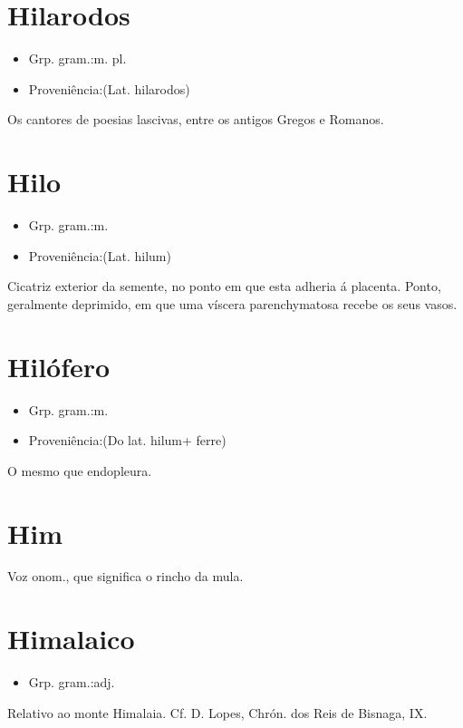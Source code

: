 \documentclass{article}
\begin{document}
\section{Hilarodos}
\begin{itemize}
\item {Grp. gram.:m. pl.}
\end{itemize}
\begin{itemize}
\item {Proveniência:(Lat. \textunderscore hilarodos\textunderscore )}
\end{itemize}
Os cantores de poesias lascivas, entre os antigos Gregos e Romanos.
\section{Hilo}
\begin{itemize}
\item {Grp. gram.:m.}
\end{itemize}
\begin{itemize}
\item {Proveniência:(Lat. \textunderscore hilum\textunderscore )}
\end{itemize}
Cicatriz exterior da semente, no ponto em que esta adheria á placenta.
Ponto, geralmente deprimido, em que uma víscera parenchymatosa recebe os seus vasos.
\section{Hilófero}
\begin{itemize}
\item {Grp. gram.:m.}
\end{itemize}
\begin{itemize}
\item {Proveniência:(Do lat. \textunderscore hilum\textunderscore  + \textunderscore ferre\textunderscore )}
\end{itemize}
O mesmo que \textunderscore endopleura\textunderscore .
\section{Him}
Voz onom., que significa o rincho da mula.
\section{Himalaico}
\begin{itemize}
\item {Grp. gram.:adj.}
\end{itemize}
Relativo ao monte Himalaia. Cf. D. Lopes, \textunderscore Chrón. dos Reis de Bisnaga\textunderscore , IX.
\end{document}
